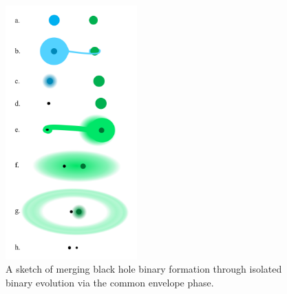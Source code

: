 \documentclass[iop,onecolumn]{revtex4-1}
\begin{document}
\begin{figure}
	\centering
	\includegraphics[width=0.45\textwidth]{channel1.png}
	\caption{\label{fig:isol_binary} A sketch of merging black hole binary formation through isolated binary evolution via the common envelope phase.}
\end{figure}
\end{document}

